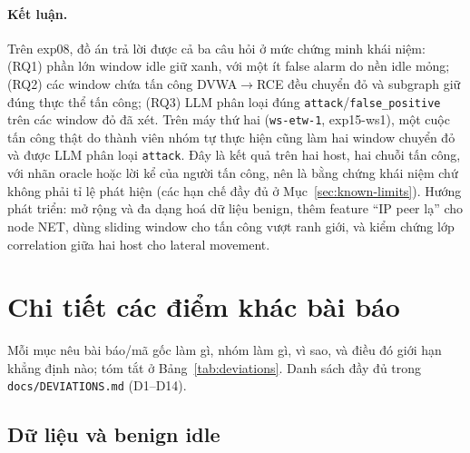 \paragraph{Kết luận.}
Trên exp08, đồ án trả lời được cả ba câu hỏi ở mức chứng minh khái niệm: (RQ1) phần lớn window idle giữ xanh, với một ít false alarm do nền idle mỏng; (RQ2) các window chứa tấn công DVWA$\rightarrow$RCE đều chuyển đỏ và subgraph giữ đúng thực thể tấn công; (RQ3) LLM phân loại đúng \texttt{attack}/\texttt{false\_positive} trên các window đỏ đã xét. Trên máy thứ hai (\texttt{ws-etw-1}, exp15-ws1), một cuộc tấn công thật do thành viên nhóm tự thực hiện cũng làm hai window chuyển đỏ và được LLM phân loại \texttt{attack}. Đây là kết quả trên hai host, hai chuỗi tấn công, với nhãn oracle hoặc lời kể của người tấn công, nên là bằng chứng khái niệm chứ không phải tỉ lệ phát hiện (các hạn chế đầy đủ ở Mục~\ref{sec:known-limits}). Hướng phát triển: mở rộng và đa dạng hoá dữ liệu benign, thêm feature ``IP peer lạ'' cho node NET, dùng sliding window cho tấn công vượt ranh giới, và kiểm chứng lớp correlation giữa hai host cho lateral movement.

\appendix
\section{Chi tiết các điểm khác bài báo}
\label{sec:appendix-dev}
Mỗi mục nêu bài báo/mã gốc làm gì, nhóm làm gì, vì sao, và điều đó giới hạn khẳng định nào; tóm tắt ở Bảng~\ref{tab:deviations}. Danh sách đầy đủ trong \texttt{docs/DEVIATIONS.md} (D1--D14).

\subsection{Dữ liệu và benign idle}
\label{sec:dev-data}

